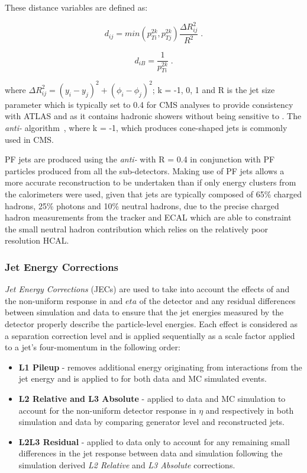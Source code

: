 These distance variables are defined as:

\begin{equation}
d_{ij} = min(p^{2k}_{Ti},p^{2k}_{Tj}) \frac{\Delta R^{2}_{ij}}{R^{2}} \;.
\label{eq:jetAlgo1}
\end{equation}

\begin{equation}
d_{iB} = \frac{1}{p^{2k}_{Ti}} \;.
\label{eq:jetAlgo2}
\end{equation}

where $\Delta R^{2}_{ij} = (y_{i} - y_{j})^{2} + (\phi_{i} - \phi_{j})^{2}$; k = -1, 0, 1 and R is the jet size parameter which is typically set to 0.4 for CMS analyses to provide consistency with ATLAS and as it contains hadronic showers without being sensitive to \PU.
The \emph{anti-\kt} algorithm~\cite{Cacciari:2008gp}, where k = -1, which produces cone-shaped jets is commonly used in CMS.

PF jets are produced using the \emph{anti-\kt} with R = 0.4 in conjunction with PF particles produced from all the sub-detectors.
Making use of PF jets allows a more accurate reconstruction to be undertaken than if only energy clusters from the calorimeters were used, given that jets are typically composed of 65\% charged hadrons, 25\% photons and 10\% neutral hadrons, due to the precise charged hadron measurements from the tracker and ECAL which are able to constraint the small neutral hadron contribution which relies on the relatively poor resolution HCAL.

\subsubsection{Jet Energy Corrections}
\emph{Jet Energy Corrections} (JECs) are used to take into account the effects of \PU and the non-uniform response in \pT and $eta$ of the detector and any residual differences between simulation and data to ensure that the jet energies measured by the detector properly describe the particle-level energies.
Each effect is considered as a separation correction level and is applied sequentially as a scale factor applied to a jet's four-momentum in the following order:

\begin{itemize}
\item \textbf{L1 Pileup} - removes additional energy originating from \PU interactions from the jet energy and is applied to for both data and MC simulated events. 
\item \textbf{L2 Relative and L3 Absolute} - applied to data and MC simulation to account for the non-uniform detector response in $\eta$ and \pT respectively in both simulation and data by comparing generator level and reconstructed jets.
\item \textbf{L2L3 Residual} - applied to data only to account for any remaining small differences in the jet response between data and simulation following the simulation derived \emph{L2 Relative} and \emph{L3 Absolute} corrections.
\end{itemize}

